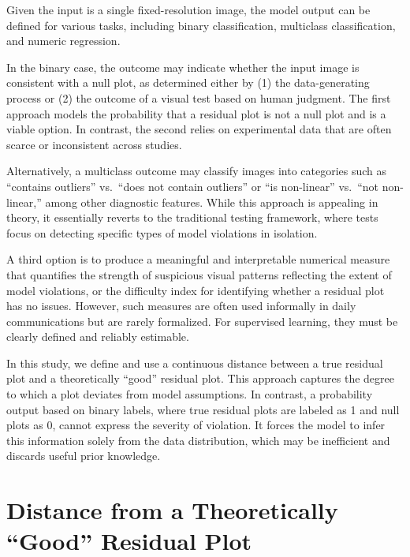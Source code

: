 \documentclass[]{interact}
\theoremstyle{plain}%
\theoremstyle{definition}
\theoremstyle{remark}
\begin{document}
Given the input is a single fixed-resolution image, the model output can
be defined for various tasks, including binary classification,
multiclass classification, and numeric regression.

In the binary case, the outcome may indicate whether the input image is
consistent with a null plot, as determined either by (1) the
data-generating process or (2) the outcome of a visual test based on
human judgment. The first approach models the probability that a
residual plot is not a null plot and is a viable option. In contrast,
the second relies on experimental data that are often scarce or
inconsistent across studies.

Alternatively, a multiclass outcome may classify images into categories
such as ``contains outliers'' vs.~``does not contain outliers'' or ``is
non-linear'' vs.~``not non-linear,'' among other diagnostic features.
While this approach is appealing in theory, it essentially reverts to
the traditional testing framework, where tests focus on detecting
specific types of model violations in isolation.

A third option is to produce a meaningful and interpretable numerical
measure that quantifies the strength of suspicious visual patterns
reflecting the extent of model violations, or the difficulty index for
identifying whether a residual plot has no issues. However, such
measures are often used informally in daily communications but are
rarely formalized. For supervised learning, they must be clearly defined
and reliably estimable.

In this study, we define and use a continuous distance between a true
residual plot and a theoretically ``good'' residual plot. This approach
captures the degree to which a plot deviates from model assumptions. In
contrast, a probability output based on binary labels, where true
residual plots are labeled as 1 and null plots as 0, cannot express the
severity of violation. It forces the model to infer this information
solely from the data distribution, which may be inefficient and discards
useful prior knowledge.

\section{Distance from a Theoretically ``Good'' Residual
Plot}\label{sec-model-distance-between-residual-plots}
\end{document}
